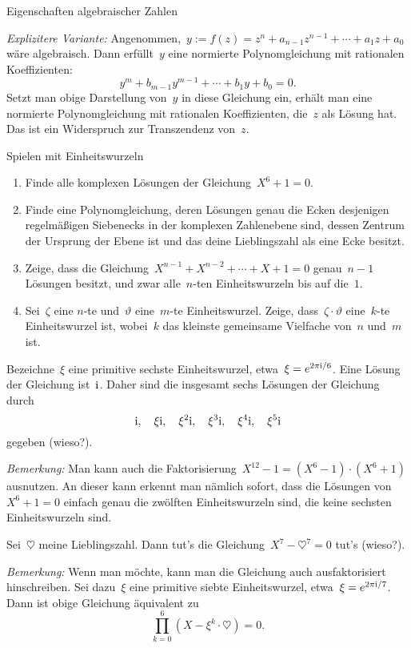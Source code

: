 \documentclass{algblatt}
\begin{document}
\begin{aufgabe}{Eigenschaften algebraischer Zahlen}
\begin{loesungE}
\emph{Explizitere Variante:} Angenommen,~$y := f(z) = z^n + a_{n-1} z^{n-1} + \cdots +
a_1 z + a_0$ wäre algebraisch. Dann erfüllt~$y$ eine normierte Polynomgleichung
mit rationalen Koeffizienten:
\[ y^m + b_{m-1} y^{m-1} + \cdots + b_1 y + b_0 = 0. \]
Setzt man obige Darstellung von~$y$ in diese Gleichung ein, erhält man eine
normierte Polynomgleichung mit rationalen Koeffizienten, die~$z$ als Lösung
hat. Das ist ein Widerspruch zur Transzendenz von~$z$.
\end{loesungE}
\end{aufgabe}

\ifloesungen\newpage\fi
\begin{aufgabe}{Spielen mit Einheitswurzeln}
\begin{enumerate}
\item Finde alle komplexen Lösungen der Gleichung~$X^6 + 1 = 0$.
\item Finde eine Polynomgleichung, deren Lösungen genau die Ecken
desjenigen re\-gel\-mä\-ßi\-gen Siebenecks in der komplexen Zahlenebene sind, dessen Zentrum
der Ursprung der Ebene ist und das deine Lieblingszahl als eine Ecke besitzt.
\item Zeige, dass die Gleichung~$X^{n-1} + X^{n-2} + \cdots + X + 1 = 0$
genau~$n-1$ Lösungen besitzt, und zwar alle~$n$-ten Einheitswurzeln bis auf
die~$1$.
\item Sei~$\zeta$ eine $n$-te und~$\vartheta$ eine~$m$-te Einheitswurzel.
Zeige, dass~$\zeta \cdot \vartheta$ eine~$k$-te Einheitswurzel ist, wobei~$k$
das kleinste gemeinsame Vielfache von~$n$ und~$m$ ist.
\end{enumerate}
\begin{loesungE}
\item Bezeichne~$\xi$ eine primitive sechste Einheitswurzel, etwa~$\xi =
e^{2\pi\mathrm{i} / 6}$. Eine Lösung der Gleichung ist~$\mathrm{i}$. Daher sind die
insgesamt sechs Lösungen der Gleichung durch
\[ \mathrm{i},\quad \xi \mathrm{i},\quad \xi^2 \mathrm{i},\quad \xi^3 \mathrm{i},\quad \xi^4 \mathrm{i},\quad \xi^5 \mathrm{i} \]
gegeben (wieso?).

\emph{Bemerkung:} Man kann auch die Faktorisierung~$X^{12} - 1 = (X^6 - 1)
\cdot (X^6 + 1)$ ausnutzen. An dieser kann erkennt man nämlich sofort, dass
die Lösungen von~$X^6 + 1 = 0$ einfach genau die zwölften Einheitswurzeln sind,
die keine sechsten Einheitswurzeln sind.

\item Sei~$\heartsuit$ meine Lieblingszahl. Dann tut's die Gleichung~$X^7 -
\heartsuit^7 = 0$ tut's (wieso?).

\emph{Bemerkung:} Wenn man möchte, kann man die Gleichung auch ausfaktorisiert
hinschreiben. Sei dazu~$\xi$ eine primitive siebte Einheitswurzel, etwa~$\xi =
e^{2\pi\mathrm{i} / 7}$. Dann ist obige Gleichung äquivalent zu
\[ \prod_{k=0}^6 (X - \xi^k \cdot \heartsuit) = 0. \]


\end{loesungE}
\end{aufgabe}
\end{document}
